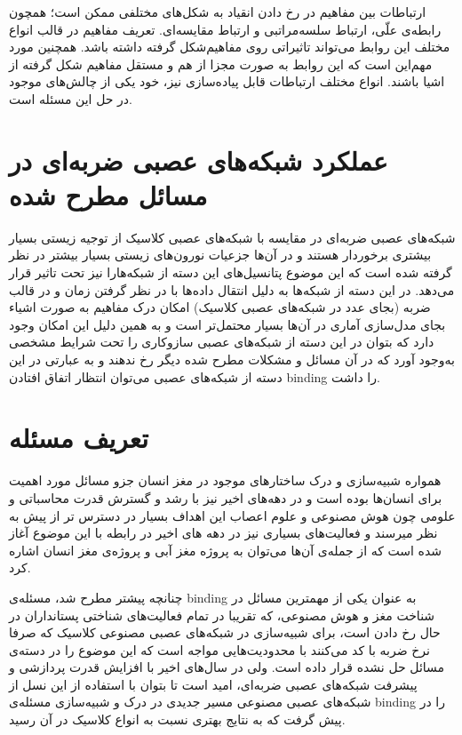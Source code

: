 \documentclass[12pt]{report}
\begin{document}
	ارتباطات بین مفاهیم در رخ دادن انقیاد به شکل‌های مختلفی ممکن است؛ همچون رابطه‌ی علّی، ارتباط سلسه‌مراتبی و ارتباط مقایسه‌ای. تعریف مفاهیم در قالب انواع مختلف این روابط می‌تواند تاثیراتی روی مفاهیم‌شکل گرفته داشته باشد. همچنین مورد مهم‌این است که این روابط به صورت مجزا از هم و مستقل مفاهیم شکل گرفته‌ از اشیا باشند. انواع مختلف ارتباطات قابل پیاده‌سازی نیز، خود یکی از چالش‌های موجود در حل این مسئله است.
	
	\section{عملکرد شبکه‌های عصبی ضربه‌ای در مسائل مطرح شده}
	شبکه‌های عصبی ضربه‌ای در مقایسه با شبکه‌های عصبی کلاسیک از توجیه زیستی بسیار بیشتری برخوردار هستند و در آن‌ها جزعیات نورون‌های زیستی بسیار بیشتر در نظر گرفته شده است که این موضوع پتانسیل‌های این دسته از شبکه‌هارا نیز تحت تاثیر قرار می‌دهد. در این دسته از شبکه‌ها به دلیل انتقال داده‌ها با در نظر گرفتن زمان و در قالب ضربه (بجای عدد در شبکه‌‌های عصبی کلاسیک) امکان درک مفاهیم به صورت اشیاء بجای مدل‌سازی آماری در آن‌ها بسیار محتمل‌تر است و به همین دلیل این امکان وجود دارد که بتوان در این دسته از شبکه‌های عصبی سازوکاری را تحت شرایط مشخصی به‌وجود آورد که در آن مسائل و مشکلات مطرح شده دیگر رخ ندهند و به عبارتی در این دسته از شبکه‌های عصبی می‌توان انتظار اتفاق افتادن \gls{binding} را داشت.
	
	\section{تعریف مسئله}
	همواره شبیه‌سازی و درک ساختار‌های موجود در مغز انسان جزو مسائل مورد اهمیت برای انسان‌ها بوده است و در دهه‌های اخیر نیز با رشد و گسترش قدرت محاسباتی و علومی چون هوش مصنوعی و علوم اعصاب این اهداف بسیار در دسترس تر از پیش به نظر میرسند و فعالیت‌های بسیاری نیز در دهه های اخیر در رابطه با این موضوع آغاز شده است که از جمله‌ی آن‌ها می‌توان به پروژه مغز آبی و پروژه‌ی مغز انسان اشاره کرد.
	
	چنانچه پیشتر مطرح شد، مسئله‌ی \gls{binding} به عنوان یکی از مهمترین مسائل در شناخت مغز و هوش مصنوعی، که تقریبا در تمام فعالیت‌های شناختی پستانداران در حال رخ دادن است، برای شبیه‌سازی در شبکه‌های عصبی مصنوعی کلاسیک که صرفا نرخ ضربه با کد می‌کنند با محدودیت‌هایی مواجه است \cite{vonderMalsburg1999} که این موضوع را در دسته‌ی مسائل حل نشده قرار داده است. ولی در سال‌های اخیر با افزایش قدرت پردازشی و پیشرفت شبکه‌های عصبی ضربه‌ای‌، امید است تا بتوان با استفاده از این نسل از شبکه‌های عصبی مصنوعی مسیر جدیدی در درک و شبیه‌سازی مسئله‌ی \gls{binding} را در پیش گرفت که به نتایج بهتری نسبت به انواع کلاسیک در آن رسید.
	
\end{document}
